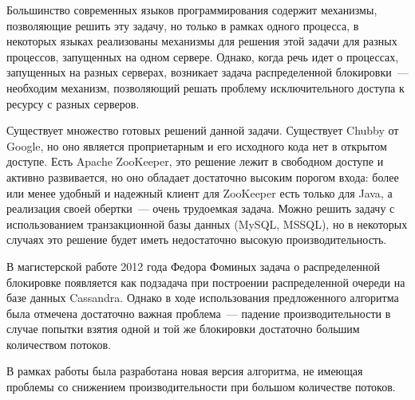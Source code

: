 Большинство современных языков программирования содержит механизмы, позволяющие решить эту задачу, но только в рамках одного процесса, в некоторых языках реализованы механизмы для решения этой задачи для разных процессов, запущенных на одном сервере. Однако, когда речь идет о процессах, запущенных на разных серверах, возникает задача распределенной блокировки~--- необходим механизм, позволяющий решать проблему исключительного доступа к ресурсу с разных серверов.

Существует множество готовых решений данной задачи. Существует Chubby от Google, но оно является проприетарным и его исходного кода нет в открытом доступе. Есть Apache ZooKeeper, это решение лежит в свободном доступе и активно развивается, но оно обладает достаточно высоким порогом входа: более или менее удобный и надежный клиент для ZooKeeper есть только для Java, а реализация своей обертки~--- очень трудоемкая задача. Можно решить задачу с использованием транзакционной базы данных (MySQL, MSSQL), но в некоторых случаях это решение будет иметь недостаточно высокую производительность.

В магистерской работе 2012 года Федора Фоминых задача о распределенной блокировке появляется как подзадача при построении распределенной очереди на базе данных Cassandra. Однако в ходе использования предложенного алгоритма была отмечена достаточно важная проблема~--- падение производительности в случае попытки взятия одной и той же блокировки достаточно большим количеством потоков.

В рамках работы была разработана новая версия алгоритма, не имеющая проблемы со снижением производительности при большом количестве потоков.
